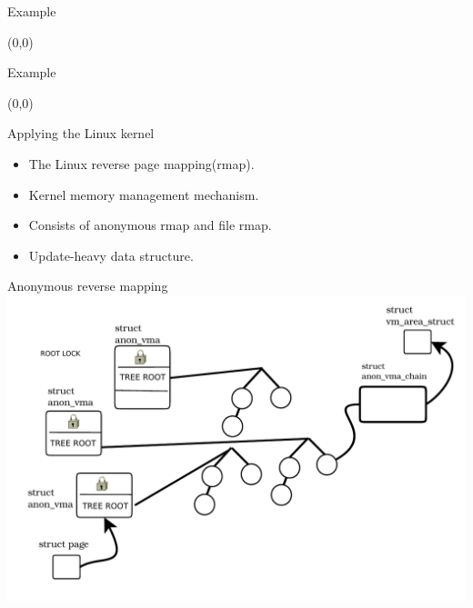 \documentclass[english]{beamer} %
\begin{document}
\begin{frame}{Example}
\begin{textblock}{1}(0,0)
\end{textblock}
\end{frame}

\begin{frame}{Example}
\begin{textblock}{1}(0,0)
\end{textblock}
\end{frame}


\begin{frame}{Applying the Linux kernel}
    \begin{itemize}[<+-| alert@+>]
    \item The Linux reverse page mapping(rmap).
    \item Kernel memory management mechanism.
    \item Consists of anonymous rmap and file rmap.
    \item Update-heavy data structure.
    \end{itemize}
\end{frame}

\begin{frame}{Anonymous reverse mapping}
\includegraphics[scale=0.5]{fig/anon_vma_default_0}
\end{frame}
\end{document}
